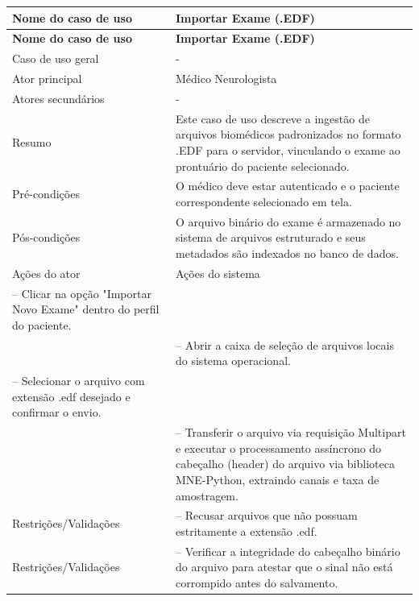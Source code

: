\FloatBarrier{}
\nopagebreak[4]
\begingroup
\fontsize{10}{12}\selectfont
\setlength{\tabcolsep}{3pt}
\renewcommand{\arraystretch}{1.15}
\addtocounter{table}{-1}
\begin{longtable}{|>{\raggedright\arraybackslash}p{}|>{\raggedright\arraybackslash}p{}|}
\hline
\textbf{Nome do caso de uso} & \textbf{Importar Exame (.EDF)} \\ \hline
\endfirsthead
\hline
\textbf{Nome do caso de uso} & \textbf{Importar Exame (.EDF)} \\ \hline
\endhead
Caso de uso geral & - \\ \hline
Ator principal & Médico Neurologista \\ \hline
Atores secundários & - \\ \hline
Resumo & Este caso de uso descreve a ingestão de arquivos biomédicos padronizados no formato .EDF para o servidor, vinculando o exame ao prontuário do paciente selecionado. \\ \hline
Pré-condições & O médico deve estar autenticado e o paciente correspondente selecionado em tela. \\ \hline
Pós-condições & O arquivo binário do exame é armazenado no sistema de arquivos estruturado e seus metadados são indexados no banco de dados. \\ \hline
Ações do ator & Ações do sistema \\ \hline
1 – Clicar na opção "Importar Novo Exame" dentro do perfil do paciente. &  \\ \hline
 & 2 – Abrir a caixa de seleção de arquivos locais do sistema operacional. \\ \hline
3 – Selecionar o arquivo com extensão .edf desejado e confirmar o envio. &  \\ \hline
 & 4 – Transferir o arquivo via requisição Multipart e executar o processamento assíncrono do cabeçalho (header) do arquivo via biblioteca MNE-Python, extraindo canais e taxa de amostragem. \\ \hline
Restrições/Validações & 1 – Recusar arquivos que não possuam estritamente a extensão .edf. \\ \hline
Restrições/Validações & 2 – Verificar a integridade do cabeçalho binário do arquivo para atestar que o sinal não está corrompido antes do salvamento. \\ \hline
\end{longtable}
\endgroup
{}
